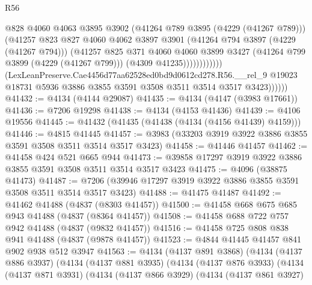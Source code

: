 \begin{lexlean}{R56}
\begin{coremodule}
                                @828
                                @4060
                                @4063
                                @3895
                                @3902
                                (@41264 @789 @3895 (@4229 (@41267 @789)))
                                (@41257
                                  @823
                                  @827
                                  @4060
                                  @4062
                                  @3897
                                  @3901
                                  (@41264 @794 @3897 (@4229 (@41267 @794)))
                                  (@41257
                                    @825
                                    @371
                                    @4060
                                    @4060
                                    @3899
                                    @3427
                                    (@41264 @799 @3899 (@4229 (@41267 @799)))
                                    (@4309 @41235))))))))))))
              (LexLeanPreserve.Cae4456d77aa62528ed0bd9d0612cd278.R56.__rel_9
                @19023
                @18731
                @5936
                @3886
                @3855
                @3591
                @3508
                @3511
                @3514
                @3517
                @3423))))))
@41432 := @4134 (@4144 @29087)
@41435 := @4134 (@4147 (@3983 @17661))
@41436 := @7206 @19298
@41438 := @4134 (@4153 @41436)
@41439 := @4106 @19556
@41445 := @41432 (@41435 (@41438 (@4134 (@4156 @41439) @4159)))
@41446 := @4815 @41445
@41457 := @3983 (@33203 @3919 @3922 @3886 @3855 @3591 @3508 @3511 @3514 @3517 @3423)
@41458 := @41446 @41457
@41462 := @41458 @424 @521 @665 @944
@41473 := @39858 @17297 @3919 @3922 @3886 @3855 @3591 @3508 @3511 @3514 @3517 @3423
@41475 := @4096 (@38875 @41473)
@41487 := @7206 (@39946 @17297 @3919 @3922 @3886 @3855 @3591 @3508 @3511 @3514 @3517 @3423)
@41488 := @41475 @41487
@41492 := @41462 @41488 (@4837 (@8303 @41457))
@41500 := @41458 @668 @675 @685 @943 @41488 (@4837 (@8364 @41457))
@41508 := @41458 @688 @722 @757 @942 @41488 (@4837 (@9832 @41457))
@41516 := @41458 @725 @808 @838 @941 @41488 (@4837 (@9878 @41457))
@41523 := @4844 @41445 @41457 @841 @902 @938 @512 @3947
@41563 := @4134
    (@4137 @891 @3868)
    (@4134
      (@4137 @886 @3937)
      (@4134
        (@4137 @881 @3935)
        (@4134
          (@4137 @876 @3933)
          (@4134
            (@4137 @871 @3931)
            (@4134
              (@4137 @866 @3929)
              (@4134
                (@4137 @861 @3927)

\end{coremodule}
\end{lexlean}
